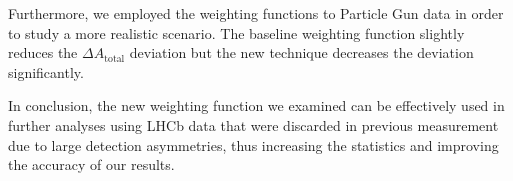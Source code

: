 \documentclass{article}
\begin{document}
        Furthermore, we employed the weighting functions to Particle Gun data in order to study a more realistic scenario.
        The baseline weighting function slightly reduces the $\Delta A_\text{total}$ deviation but the new technique decreases the deviation significantly.
        
        In conclusion, the new weighting function we examined can be effectively used in further analyses using LHCb data that were discarded in previous measurement due to large detection asymmetries, thus increasing the statistics and improving the accuracy of our results.
        
        \pagebreak
        \nocite{*}
        \printbibliography[notcategory=cited]
\end{document}
